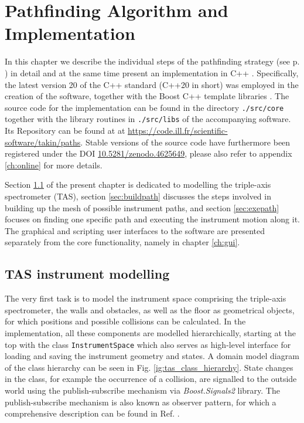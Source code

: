 %
%

\chapter{Pathfinding Algorithm and Implementation}
\label{ch:impl}

In this chapter we describe the individual steps of the pathfinding strategy (see p. \pageref{sec:strategy})
in detail and at the same time present an implementation in C++ \cite{Stroustrup2008, Stroustrup2018}. 
Specifically, the latest version 20 of the C++ standard \cite{ISOCPP20} (C++20 in short)
was employed in the creation of the software, together with the Boost C++ template libraries \cite{web_boost}. 
The source code for the implementation can be found in the directory \lstinline|./src/core| 
together with the library routines in \lstinline|./src/libs| of the accompanying software.
Its Repository can be found at at \url{https://code.ill.fr/scientific-software/takin/paths}. 
Stable versions of the source code have furthermore been registered under the DOI 
\href{https://doi.org/10.5281/zenodo.4625649}{10.5281/zenodo.4625649}, please also refer to 
appendix \ref{ch:online} for more details.

Section \ref{sec:tasmodel} of the present chapter is dedicated to modelling the triple-axis spectrometer (TAS),
section \ref{sec:buildpath} discusses the steps involved in building up the mesh of possible instrument paths, 
and section \ref{sec:exepath} focuses on finding one specific path and executing the instrument motion along it.
The graphical and scripting user interfaces to the software are presented separately from the core functionality, 
namely in chapter \ref{ch:gui}.




\section{TAS instrument modelling}
\label{sec:tasmodel}
The very first task is to model the instrument space comprising the triple-axis spectrometer, the walls and
obstacles, as well as the floor as geometrical objects, for which positions and possible collisions can be
calculated. In the implementation, all these components are modelled hierarchically, starting at the top with the class
\lstinline[language=C++]|InstrumentSpace| which also serves as high-level interface for loading and saving
the instrument geometry and states. A domain model diagram of the class hierarchy can be seen
in Fig. \ref{ig:tas_class_hierarchy}.
State changes in the class, for example the occurrence of a collision, are signalled to the outside world
using the publish-subscribe mechanism via \textit{Boost.Signals2} \cite{web_boost_signals} library.
The publish-subscribe mechanism is also known as observer pattern, for which a comprehensive description 
can be found in Ref. \cite[Ch. 4.4.2, pp. 143-148]{FUH_prog2019}.

